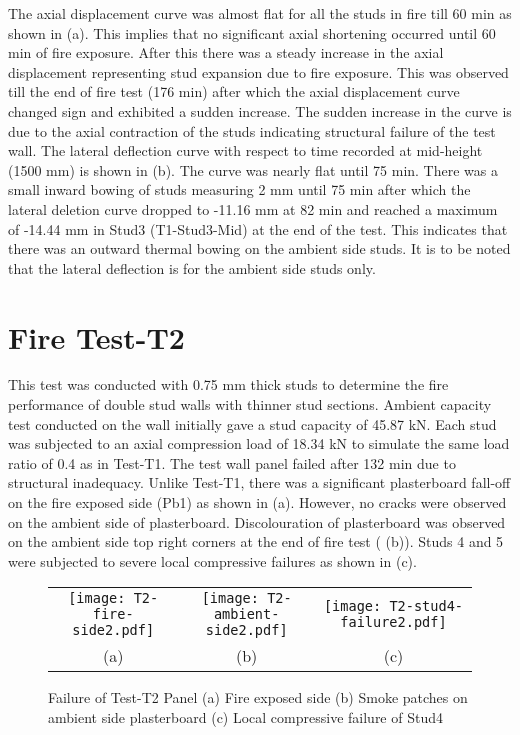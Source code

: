 The axial displacement curve was almost flat for all the studs in fire till 60 min as shown in  (a). This implies that no significant axial shortening occurred until 60 min of fire exposure. After this there was a steady increase in the axial displacement representing stud expansion due to fire exposure. This was observed till the end of fire test (176 min) after which the axial displacement curve changed sign and exhibited a sudden increase. The sudden increase in the curve is due to the axial contraction of the studs indicating structural failure of the test wall. The lateral deflection curve with respect to time recorded at mid-height (1500 mm) is shown in  (b). The curve was nearly flat until 75 min. There was a small inward bowing of studs measuring 2 mm until 75 min after which the lateral deletion curve dropped to -11.16 mm at 82 min and reached a maximum of -14.44 mm in Stud3 (T1-Stud3-Mid) at the end of the test. This indicates that there was an outward thermal bowing on the ambient side studs. It is to be noted that the lateral deflection is for the ambient side studs only.

\section{Fire Test-T2}

This test was conducted with 0.75 mm thick studs to determine the fire performance of double stud walls with thinner stud sections. Ambient capacity test conducted on the wall initially gave a stud capacity of 45.87 kN. Each stud was subjected to an axial compression load of 18.34 kN to simulate the same load ratio of 0.4 as in Test-T1. The test wall panel failed after 132 min due to structural inadequacy. Unlike Test-T1, there was a significant plasterboard fall-off on the fire exposed side (Pb1) as shown in  (a). However, no cracks were observed on the ambient side of plasterboard. Discolouration of plasterboard was observed on the ambient side top right corners at the end of fire test ( (b)). Studs 4 and 5 were subjected to severe local compressive failures as shown in  (c).

\begin{figure}[!htbp]
	\centering
		\begin{tabular}{ccc}
			\texttt{[image: T2-fire-side2.pdf]} & 
			\texttt{[image: T2-ambient-side2.pdf]} &
			\texttt{[image: T2-stud4-failure2.pdf]} \\	 
			(a) & (b) & (c)  \\ 
		\end{tabular} 
		\caption{Failure of Test-T2 Panel (a) Fire exposed side (b) Smoke patches on ambient side plasterboard (c) Local compressive failure of Stud4}
		\label{fig:T2-failure}
\end{figure}

